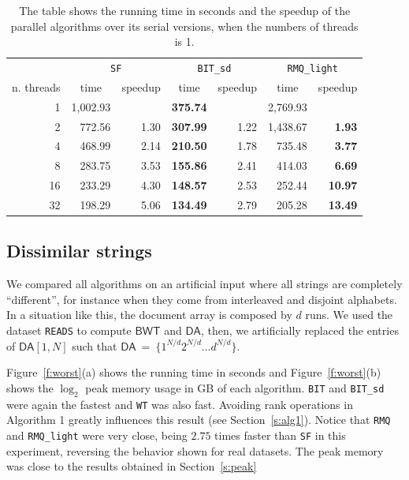 \documentclass{elsarticle}
\newcommand{\DA}{\ensuremath{\mathsf{DA}}\xspace}
\newcommand{\BWT}{\ensuremath{\mathsf{BWT}}\xspace}
\newcommand{\st}{\texttt{SF}\xspace}
\newcommand{\bit}{\texttt{BIT}\xspace}
\newcommand{\bitsd}{\texttt{BIT\_sd}\xspace}
\newcommand{\wt}{\texttt{WT}\xspace}
\newcommand{\gog}{\texttt{RMQ\_light}\xspace}
\newcommand{\gognz}{\texttt{RMQ}\xspace}
\begin{document}
\begin{table}[t]
\setlength{\tabcolsep}{5pt}
\renewcommand{\arraystretch}{1.1}
\centering
\caption{
The table shows the running time in seconds and the speedup of the parallel algorithms over its serial versions, when the numbers of threads is 1.
}
\label{t:speedup}
\begin{tabular}{r|rr|rr|rr}
           & \multicolumn{2}{c|}{\st} & \multicolumn{2}{c|}{\bitsd}                             & \multicolumn{2}{c}{\gog}                               \\
n. threads & \multicolumn{1}{c}{time} & \multicolumn{1}{c|}{speedup} & \multicolumn{1}{c}{time} & \multicolumn{1}{c|}{speedup} & \multicolumn{1}{c}{time} & \multicolumn{1}{c}{speedup} \\ \hline
1  & 1,002.93 &      & \textbf{375.74} &      & 2,769.93 &                \\
2  & 772.56   & 1.30 & \textbf{307.99} & 1.22 & 1,438.67 & \textbf{1.93}  \\
4  & 468.99   & 2.14 & \textbf{210.50} & 1.78 & 735.48   & \textbf{3.77}  \\
8  & 283.75   & 3.53 & \textbf{155.86} & 2.41 & 414.03   & \textbf{6.69}  \\
16 & 233.29   & 4.30 & \textbf{148.57} & 2.53 & 252.44   & \textbf{10.97} \\
32 & 198.29   & 5.06 & \textbf{134.49} & 2.79 & 205.28   & \textbf{13.49}
\end{tabular}
\end{table}


\subsection{Dissimilar strings}\label{s:worst}

We compared all algorithms on an artificial input where
all strings are completely ``different'', for instance when
they come from interleaved and disjoint alphabets.
In a situation like this, the document array is composed by $d$ runs.
We used the dataset \texttt{READS} to compute \BWT and \DA,
then, we artificially replaced the entries of $\DA[1,N]$ such that
$\DA~=~\{1^{N/d}2^{N/d}\dots d^{N/d}\}$.

Figure~\ref{f:worst}(a) shows the running time in seconds and
Figure~\ref{f:worst}(b) shows the $\log_2$ peak memory usage in GB of each
algorithm.
\bit and \bitsd were again the fastest and \wt was also fast.
Avoiding rank operations in Algorithm 1 greatly influences this result
(see Section~\ref{s:alg1}).
Notice that \gognz and \gog were very close, being $2.75$ times faster than
\st in this experiment, reversing the behavior shown for real datasets. The peak memory
was close to the results obtained in Section~\ref{s:peak}
\end{document}
